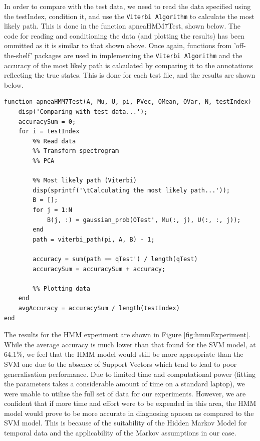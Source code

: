 In order to compare with the test data, we need to read the data specified using the testIndex, condition it, and use the \verb!Viterbi Algorithm! to calculate the most likely path. This is done in the function apneaHMM7Test, shown below. The code for reading and conditioning the data (and plotting the results) has been ommitted as it is similar to that shown above. Once again, functions from 'off-the-shelf' packages are used in implementing the \verb!Viterbi Algorithm! and the accuracy of the most likely path is calculated by comparing it to the annotations reflecting the true states. This is done for each test file, and the results are shown below.  

\begin{lstlisting}
function apneaHMM7Test(A, Mu, U, pi, PVec, OMean, OVar, N, testIndex)
    disp('Comparing with test data...');
    accuracySum = 0;
    for i = testIndex
        %% Read data
        %% Transform spectrogram
        %% PCA

        %% Most likely path (Viterbi)
        disp(sprintf('\tCalculating the most likely path...'));
        B = [];
        for j = 1:N
            B(j, :) = gaussian_prob(OTest', Mu(:, j), U(:, :, j));
        end
        path = viterbi_path(pi, A, B) - 1;
        
        accuracy = sum(path == qTest') / length(qTest)
        accuracySum = accuracySum + accuracy;
        
        %% Plotting data
    end
    avgAccuracy = accuracySum / length(testIndex)
end
\end{lstlisting}

The results for the HMM experiment are shown in Figure \ref{fig:hmmExperiment}. While the average accuracy is much lower than that found for the SVM model, at 64.1\%, we feel that the HMM model would still be more appropriate than the SVM one due to the absence of Support Vectors which tend to lead to poor generalisation performance. Due to limited time and computational power (fitting the parameters takes a considerable amount of time on a standard laptop), we were unable to utilise the full set of data for our experiments. However, we are confident that if more time and effort were to be expended in this area, the HMM model would prove to be more accurate in diagnosing apnoea as compared to the SVM model. This is because of the suitability of the Hidden Markov Model for temporal data and the applicability of the Markov assumptions in our case.

